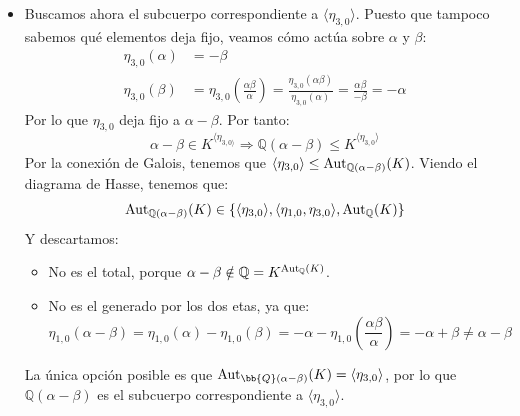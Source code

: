 \begin{ejemplo}
\begin{itemize}
\begin{itemize}
\begin{equation*}
                    \end{equation*}
            \end{itemize}
            La única opción posible es que $\Aut_{\bb{Q}(\alpha+\beta)}(K) = \langle \eta_{2,0} \rangle $, por lo que $\mathbb{Q}(\alpha+\beta)$ es el subcuerpo correspondiente a $\langle \eta_{2,0} \rangle $.
        \item Buscamos ahora el subcuerpo correspondiente a $\langle \eta_{3,0} \rangle $.  Puesto que tampoco sabemos qué elementos deja fijo, veamos cómo actúa sobre $\alpha$ y $\beta$:
        \begin{align*}
            \eta_{3,0}(\alpha) &= -\beta\\
            \eta_{3,0}(\beta) &= \eta_{3,0}\left(\frac{\alpha\beta}{\alpha}\right) = \frac{\eta_{3,0}(\alpha\beta)}{\eta_{3,0}(\alpha)} = \frac{\alpha\beta}{-\beta} = -\alpha
        \end{align*}
        Por lo que $\eta_{3,0}$ deja fijo a $\alpha-\beta$. Por tanto:
        \begin{equation*}
            \alpha - \beta \in K^{\langle \eta_{3,0 \rangle }} \Longrightarrow \mathbb{Q}(\alpha-\beta)\leq K^{\langle \eta_{3,0} \rangle }
        \end{equation*}
        Por la conexión de Galois, tenemos que $\langle \eta_{3,0} \rangle  \leq \operatorname{Aut}_{\mathbb{Q}(\alpha-\beta)}(K)$. Viendo el diagrama de Hasse, tenemos que:
        \begin{equation*}
            \operatorname{Aut}_{\mathbb{Q}(\alpha-\beta)}(K) \in \{\langle \eta_{3,0} \rangle, \langle \eta_{1,0},\eta_{3,0} \rangle, \operatorname{Aut}_\mathbb{Q}(K)  \}
        \end{equation*}
        Y descartamos:
        \begin{itemize}
            \item No es el total, porque $\alpha-\beta\notin \mathbb{Q} = K^{\operatorname{Aut}_\mathbb{Q}(K)}$.
            \item No es el generado por los dos etas, ya que:
            \begin{equation*}
                \eta_{1,0}(\alpha-\beta) = \eta_{1,0}(\alpha) - \eta_{1,0}(\beta) = -\alpha - \eta_{1,0}\left(\frac{\alpha\beta}{\alpha}\right) = -\alpha + \beta \neq \alpha - \beta
            \end{equation*}
        \end{itemize}
        La única opción posible es que $\Aut_{\bb{Q}(\alpha-\beta)}(K) = \langle \eta_{3,0} \rangle $, por lo que $\mathbb{Q}(\alpha-\beta)$ es el subcuerpo correspondiente a $\langle \eta_{3,0} \rangle $.

\end{itemize}
\end{ejemplo}

